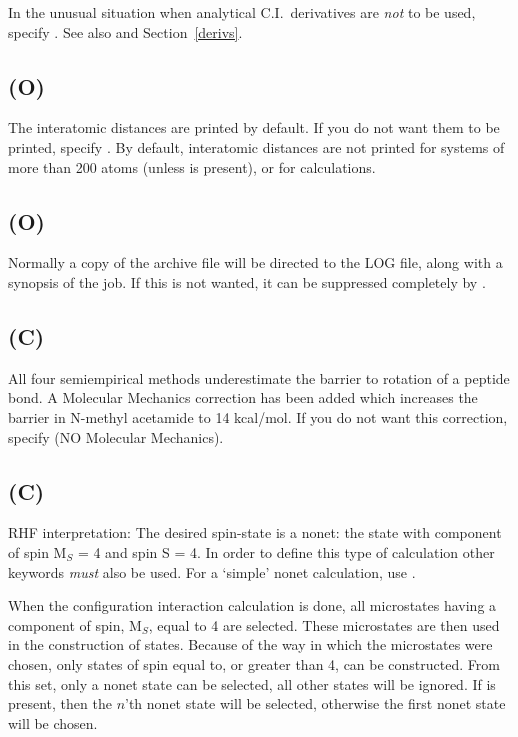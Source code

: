 In the unusual situation when analytical C.I.\ derivatives
are {\em not} to be used, specify .
See also  and Section~\ref{derivs}.


\subsection*{ (O)}
The interatomic distances are printed by default.   If  you  do  not
want  them to be printed, specify . By default, interatomic
distances are not printed for systems of
more than 200 atoms (unless  is present), or for
 calculations.


\subsection*{ (O)}
           Normally a copy of the archive file will  be  directed  to  the  LOG
   file, along with a synopsis of the job.  If this is not wanted, it can be
   suppressed completely by .

\subsection*{ (C)}
      All  four  semiempirical  methods  underestimate  the  barrier   to
   rotation  of  a  peptide bond.  A Molecular Mechanics correction has been
   added which increases the barrier in N-methyl acetamide to 14  kcal/mol.
 If   you  do  not  want  this  correction,  specify    (NO  Molecular
   Mechanics).

\subsection*{ (C)}
        RHF interpretation:  The desired spin-state is a nonet:  the  state
   with component of spin M$_S$ = 4 and spin S = 4.
In order to define this type of calculation
other keywords {\em must} also be used.  For a `simple' nonet  calculation,
use .


 When the configuration interaction calculation is done, all microstates having
a component of spin,  M$_S$, equal to 4 are selected.  These microstates are then
used in the construction of states.  Because of the way in which the microstates
were chosen, only states of spin equal to, or greater than 4, can be constructed.
From this set, only a nonet  state can be selected, all other states will be ignored.
If  is present, then the $n$'th nonet  state will be selected,
otherwise the first nonet  state will be  chosen.

